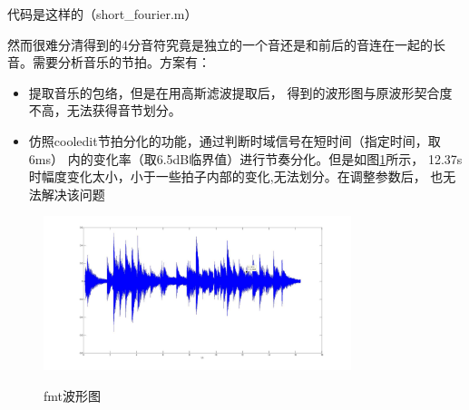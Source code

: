 \documentclass{ctexart}
\begin{document}
\begin{enumerate}
        代码是这样的（short\_fourier.m）
        

        然而很难分清得到的4分音符究竟是独立的一个音还是和前后的音连在一起的长音。需要分析音乐的节拍。方案有：
        \begin{itemize}
            \item{提取音乐的包络，但是在用高斯滤波提取后，
                得到的波形图与原波形契合度不高，无法获得音节划分。}
            \item{仿照cooledit节拍分化的功能，通过判断时域信号在短时间（指定时间，取6ms）
                    内的变化率（取6.5dB临界值）进行节奏分化。但是如图\ref{192}所示，
                    12.37s时幅度变化太小，小于一些拍子内部的变化,无法划分。在调整参数后，
                也无法解决该问题}
        \end{itemize}
        \begin{figure}
            \centering
            \includegraphics[width=0.8\textwidth]{fmt/1_9_2.jpg}\\
            \caption{fmt波形图\label{192}}
        \end{figure}



\end{enumerate}
\end{document}
